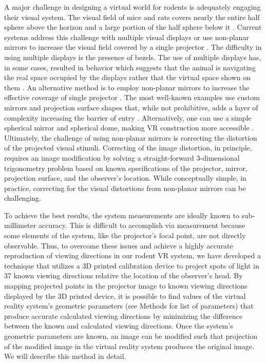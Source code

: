 \documentclass[10pt,letterpaper]{article}
\begin{document}
A major challenge in designing a virtual world for rodents is adequately engaging their visual system. The visual field of mice and rats covers nearly 
the entire half sphere above the horizon and a large portion of the half sphere below it \cite{hughes1977topography, wagor1980retinotopic, 
schuett2002mapping, wang2007area}. Current systems address this challenge with multiple visual displays \cite{keller2012sensorimotor,
 ayaz2013locomotion, saleem2013integration} or use non-planar mirrors to increase the visual field covered by a single projector 
\cite{harvey2009intracellular, schmidt2013cellular, aronov2014engagement}. The difficulty in using multiple displays is the presence of bezels. 
The use of multiple displays has, in some cases, resulted in behavior which suggests that the animal is navigating the real space occupied by 
the displays rather that the virtual space shown on them \cite{holscher2005rats}. An alternative method is to employ non-planar mirrors to 
increase the effective coverage of single projector \cite{harvey2009intracellular, schmidt2013cellular, aronov2014engagement}. 
The most well-known examples use custom mirrors and projection surface shapes that, while not prohibitive, adds a layer of complexity 
increasing the barrier of entry \cite{holscher2005rats, harvey2009intracellular}. Alternatively, one can use a simple spherical mirror and 
spherical dome, making VR construction more accessible \cite {schmidt2013cellular}. Ultimately, the challenge of using non-planar mirrors 
is correcting the distortion of the projected visual stimuli. Correcting of the image distortion, in principle, requires an image modification by 
solving a straight-forward 3-dimensional trigonometry problem based on known specifications of the projector, mirror, projection surface, 
and the observer’s location. While conceptually simple, in practice, correcting for the visual distortions from non-planar mirrors can be challenging.

To achieve the best results, the system measurements are ideally known to sub-millimeter accuracy. This is difficult to accomplish via measurement 
because some elements of the system, like the projector's focal point, are not directly observable. Thus, to overcome these issues and achieve a 
highly accurate reproduction of viewing directions in our rodent VR system, we have developed a technique that utilizes a 3D printed calibration 
device to project spots of light in 37 known viewing directions relative the location of the observer's head. By mapping projected points in the 
projector image to known viewing directions displayed by the 3D printed device, it is possible to find values of the virtual reality system's geometric 
parameters (see Methods for list of parameters) that produce accurate calculated viewing directions by minimizing the difference between the known 
and calculated viewing directions. Once the system’s geometric parameters are known, an image can be modified such that projection of the modified 
image in the virtual reality system produces the original image. We will describe this method in detail. 
\end{document}
